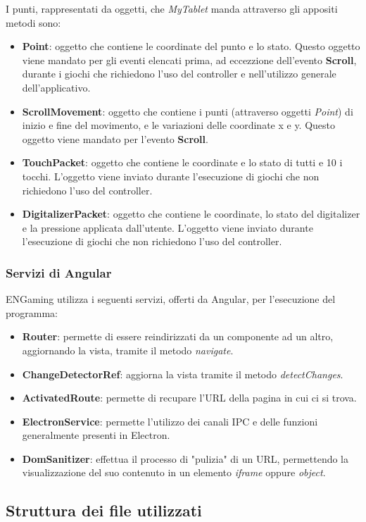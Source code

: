 I punti, rappresentati da oggetti, che \emph{MyTablet} manda attraverso gli appositi metodi sono:
\begin{itemize}
    \item \textbf{Point}: oggetto che contiene le coordinate del punto e lo stato. Questo oggetto viene mandato per gli eventi elencati prima, ad eccezzione dell'evento \textbf{Scroll}, durante i giochi che richiedono l'uso del controller e nell'utilizzo generale dell'applicativo.
    \item \textbf{ScrollMovement}: oggetto che contiene i punti (attraverso oggetti \emph{Point}) di inizio e fine del movimento, e le variazioni delle coordinate x e y. Questo oggetto viene mandato per l'evento \textbf{Scroll}.
    \item \textbf{TouchPacket}: oggetto che contiene le coordinate e lo stato di tutti e 10 i tocchi. L'oggetto viene inviato durante l'esecuzione di giochi che non richiedono l'uso del controller.
    \item \textbf{DigitalizerPacket}: oggetto che contiene le coordinate, lo stato del digitalizer e la pressione applicata dall'utente. L'oggetto viene inviato durante l'esecuzione di giochi che non richiedono l'uso del controller.
\end{itemize}
\subsubsection{Servizi di Angular}
\label{subsec:angularServices}
ENGaming utilizza i seguenti servizi, offerti da Angular, per l'esecuzione del programma:
\begin{itemize}
    \item \textbf{Router}: permette di essere reindirizzati da un componente ad un altro, aggiornando la vista, tramite il metodo \emph{navigate}.
    \item \textbf{ChangeDetectorRef}: aggiorna la vista tramite il metodo \emph{detectChanges}.
    \item \textbf{ActivatedRoute}: permette di recupare l'URL della pagina in cui ci si trova.
    \item \textbf{ElectronService}: permette l'utilizzo dei canali IPC e delle funzioni generalmente presenti in Electron.
    \item \textbf{DomSanitizer}: effettua il processo di "pulizia" di un URL, permettendo la visualizzazione del suo contenuto in un elemento \emph{iframe} oppure \emph{object}.
\end{itemize}
\subsection{Struttura dei file utilizzati}
\label{subsec:strutturaFile}
